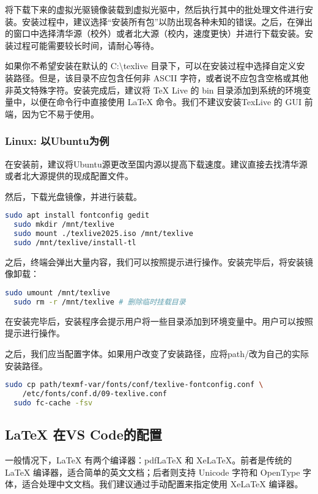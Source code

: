 \documentclass[../main.tex]{subfiles}
\begin{document}
将下载下来的虚拟光驱镜像装载到虚拟光驱中，然后执行其中的批处理文件进行安装。安装过程中，建议选择“安装所有包”以防出现各种未知的错误。之后，在弹出的窗口中选择清华源（校外）或者北大源（校内，速度更快）并进行下载安装。安装过程可能需要较长时间，请耐心等待。

如果你不希望安装在默认的 C:\textbackslash texlive 目录下，可以在安装过程中选择自定义安装路径。但是，该目录不应包含任何非 ASCII 字符，或者说不应包含空格或其他非英文特殊字符。安装完成后，建议将 TeX Live 的 bin 目录添加到系统的环境变量中，以便在命令行中直接使用 LaTeX 命令。我们不建议安装TexLive 的 GUI 前端，因为它不易于使用。

\subsubsection{Linux: 以Ubuntu为例}

在安装前，建议将Ubuntu源更改至国内源以提高下载速度。建议直接去找清华源或者北大源提供的现成配置文件。

然后，下载光盘镜像，并进行装载。

\begin{lstlisting}[language=bash]
  sudo apt install fontconfig gedit 
  sudo mkdir /mnt/texlive 
  sudo mount ./texlive2025.iso /mnt/texlive 
  sudo /mnt/texlive/install-tl
\end{lstlisting}

之后，终端会弹出大量内容，我们可以按照提示进行操作。安装完毕后，将安装镜像卸载：

\begin{lstlisting}[language=bash]
  sudo umount /mnt/texlive
  sudo rm -r /mnt/texlive # 删除临时挂载目录
\end{lstlisting}

在安装完毕后，安装程序会提示用户将一些目录添加到环境变量中。用户可以按照提示进行操作。

之后，我们应当配置字体。如果用户改变了安装路径，应将path/改为自己的实际安装路径。

\begin{lstlisting}[language=bash]
  sudo cp path/texmf-var/fonts/conf/texlive-fontconfig.conf \
    /etc/fonts/conf.d/09-texlive.conf
  sudo fc-cache -fsv
\end{lstlisting}

\subsection{LaTeX 在VS Code的配置}

一般情况下，LaTeX 有两个编译器：pdfLaTeX 和 XeLaTeX。前者是传统的 LaTeX 编译器，适合简单的英文文档；后者则支持 Unicode 字符和 OpenType 字体，适合处理中文文档。我们建议通过手动配置来指定使用 XeLaTeX 编译器。
\end{document}
